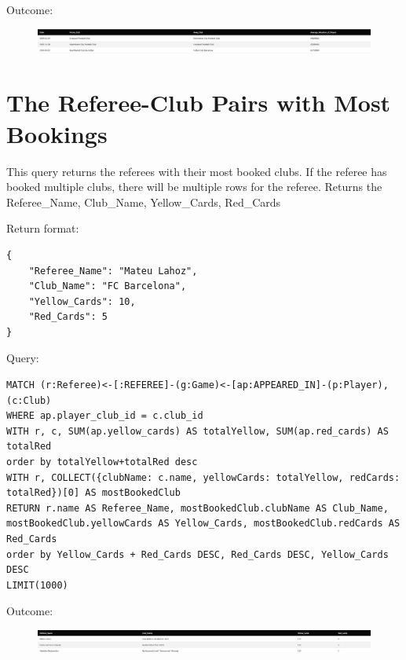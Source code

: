 \documentclass{Configuration_Files/PoliMi3i_thesis}
\begin{document}
Outcome:
\begin{figure}[H]
    \centering
    \includegraphics[width=\linewidth]{Project Template/Images/query_output/q7.png}
\end{figure}








\section{The Referee-Club Pairs with Most Bookings}
This query returns the referees with their most booked clubs. If the referee has booked multiple clubs, there will be multiple rows for the referee.
Returns the Referee\_Name, Club\_Name, Yellow\_Cards, Red\_Cards

Return format:
\begin{lstlisting}[style=json]
{
    "Referee_Name": "Mateu Lahoz",
    "Club_Name": "FC Barcelona",
    "Yellow_Cards": 10,
    "Red_Cards": 5
}
\end{lstlisting}


Query:

\begin{lstlisting}[language=Cypher]
MATCH (r:Referee)<-[:REFEREE]-(g:Game)<-[ap:APPEARED_IN]-(p:Player), (c:Club)
WHERE ap.player_club_id = c.club_id 
WITH r, c, SUM(ap.yellow_cards) AS totalYellow, SUM(ap.red_cards) AS totalRed
order by totalYellow+totalRed desc
WITH r, COLLECT({clubName: c.name, yellowCards: totalYellow, redCards: totalRed})[0] AS mostBookedClub
RETURN r.name AS Referee_Name, mostBookedClub.clubName AS Club_Name, mostBookedClub.yellowCards AS Yellow_Cards, mostBookedClub.redCards AS Red_Cards
order by Yellow_Cards + Red_Cards DESC, Red_Cards DESC, Yellow_Cards DESC
LIMIT(1000)
\end{lstlisting}


Outcome:
\begin{figure}[H]
    \centering
    \includegraphics[width=\linewidth]{Project Template/Images/query_output/q8.png}
\end{figure}
\end{document}
